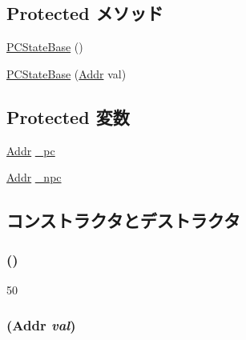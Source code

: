 \subsection*{Protected メソッド}
\begin{DoxyCompactItemize}
\item 
\hyperlink{classGenericISA_1_1PCStateBase_abf32f706435adba1d91249653666dd18}{PCStateBase} ()
\item 
\hyperlink{classGenericISA_1_1PCStateBase_a0a7e4a569d0f1d5650f1b0c0016ba547}{PCStateBase} (\hyperlink{base_2types_8hh_af1bb03d6a4ee096394a6749f0a169232}{Addr} val)
\end{DoxyCompactItemize}
\subsection*{Protected 変数}
\begin{DoxyCompactItemize}
\item 
\hyperlink{base_2types_8hh_af1bb03d6a4ee096394a6749f0a169232}{Addr} \hyperlink{classGenericISA_1_1PCStateBase_aca8c2d126b6fd936bb5c48007248beed}{\_\-pc}
\item 
\hyperlink{base_2types_8hh_af1bb03d6a4ee096394a6749f0a169232}{Addr} \hyperlink{classGenericISA_1_1PCStateBase_a1af7c66d6986c1ca86accf8304f958cf}{\_\-npc}
\end{DoxyCompactItemize}


\subsection{コンストラクタとデストラクタ}
\hypertarget{classGenericISA_1_1PCStateBase_abf32f706435adba1d91249653666dd18}{
\subsubsection[{PCStateBase}]{ ()}}
\label{classGenericISA_1_1PCStateBase_abf32f706435adba1d91249653666dd18}



\begin{DoxyCode}
50 {}
\end{DoxyCode}
\hypertarget{classGenericISA_1_1PCStateBase_a0a7e4a569d0f1d5650f1b0c0016ba547}{
\subsubsection[{PCStateBase}]{ ({\bf Addr} {\em val})}}
\label{classGenericISA_1_1PCStateBase_a0a7e4a569d0f1d5650f1b0c0016ba547}



